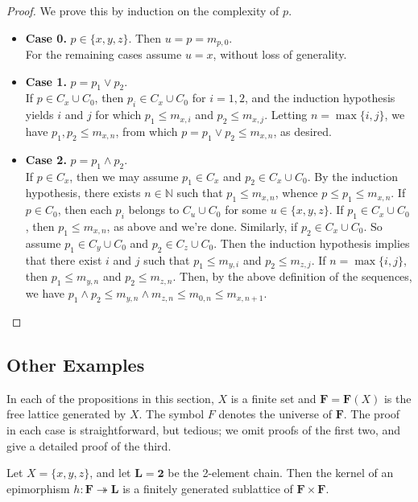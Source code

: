 \begin{proof} We prove this by induction on the complexity of $p$. 

\begin{itemize}
  \item {\bf Case 0.} $p\in \{x, y, z\}$. Then $u = p = m_{p,0}$.\\
  For the remaining cases assume $u = x$, without loss of generality.

  \item {\bf Case 1.} $p = p_1 \vee p_2$.  \\
  If $p \in C_x\cup C_0$, then $p_i \in C_x \cup C_0$ for $i = 1, 2$, and 
  the induction hypothesis yields $i$ and $j$ for which $p_1 \leqslant m_{x, i}$ and $p_2 \leqslant m_{x, j}$. Letting $n = \max\{i, j\}$, we have 
  $p_1, p_2 \leqslant m_{x, n}$, from which 
  $p = p_1 \vee p_2 \leqslant m_{x, n}$, as desired.

  \item {\bf Case 2.} $p = p_1 \wedge p_2$.  \\
  If $p \in C_x$, then we may assume $p_1 \in C_x$ and $p_2 \in C_x \cup C_0$. By the induction hypothesis, there exists $n\in \mathbb N$ such that $p_1 \leqslant m_{x, n}$, whence $p \leqslant p_1 \leqslant m_{x,n}$.
If $p \in C_0$, then each $p_i$ belongs to $C_u \cup C_0$ for some $u\in \{x, y, z\}$.  If $p_1 \in C_x \cup C_0$, then $p_1 \leqslant m_{x, n}$, as above and we're done.  Similarly, if $p_2 \in C_x \cup C_0$.  So assume $p_1 \in C_y \cup C_0$ and $p_2 \in C_z \cup C_0$. Then the induction hypothesis implies that there exist $i$ and $j$ such that 
  $p_1 \leqslant m_{y, i}$ and $p_2 \leqslant m_{z, j}$. If $n = \max\{i, j\}$, then
  $p_1 \leqslant m_{y, n}$ and $p_2 \leqslant m_{z, n}$.  Then, by the above definition of the sequences, we have
  $p_1 \wedge p_2 \leqslant m_{y, n} \wedge m_{z, n} \leqslant m_{0,n} \leqslant m_{x,n+1}$.
\end{itemize}
\end{proof}

\subsection{Other Examples}
In each of the propositions in this section, $X$ is a finite set and 
$\mathbf{F} = \mathbf{F}(X)$ is the free lattice generated by $X$.
The symbol $F$ denotes the universe of $\mathbf{F}$.  
The proof in each case is straightforward, but tedious;
we omit proofs of the first two, and give a detailed proof of the third.
\begin{prop}\label{prop:1}
  Let $X = \{x,y,z\}$, and let $\mathbf{L} = \mathbf{2}$ be the 2-element chain.    
Then the kernel of an epimorphism $h\colon \mathbf{F} \twoheadrightarrow \mathbf{L}$ is a finitely generated sublattice of $\mathbf{F} \times \mathbf{F}$.
\end{prop}

